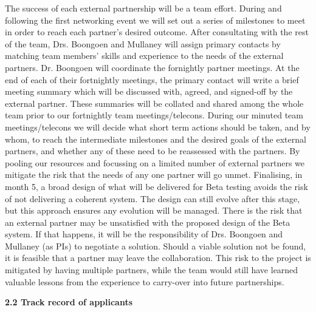 \documentclass[11pt]{article}
\begin{document}
  \noindent
  The success of each external partnership will be a team effort. During and following the first networking event we will set out a series of milestones to meet in order to reach each partner's desired outcome. After consultating with the rest of the team, Drs. Boongoen and Mullaney will assign primary contacts by matching team members' skills and experience to the needs of the external partners. Dr. Boongoen will coordinate the fornightly partner meetings. At the end of each of their fortnightly meetings, the primary contact will write a brief meeting summary which will be discussed with, agreed, and signed-off by the external partner. These summaries will be collated and shared among the whole team prior to our fortnightly team meetings/telecons. During our minuted team meetings/telecons we will decide what short term actions should be taken, and by whom, to reach the intermediate milestones and the desired goals of the external partners, and whether any of these need to be reassessed with the partners. By pooling our resources and focussing on a limited number of external partners we mitigate the risk that the needs of any one partner will go unmet. Finalising, in month 5, a broad design of what will be delivered for Beta testing avoids the risk of not delivering a coherent system. The design can still evolve after this stage, but this approach ensures any evolution will be managed. There is the risk that an external partner may be unsatisfied with the proposed design of the Beta system. If that happens, it will be the responsibility of Drs. Boongoen and Mullaney (as PIs) to negotiate a solution. Should a viable solution not be found, it is feasible that a partner may leave the collaboration. This risk to the project is mitigated by having multiple partners, while the team would still have learned valuable lessons from the experience to carry-over into future partnerships.
    
  \vspace{3mm}
  \noindent
  {\large \bf 2.2 Track record of applicants}
  
\end{document}
